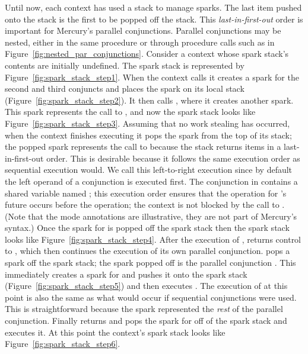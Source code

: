 Until now, each context has used a stack to manage sparks.
The last item pushed onto the stack is the first to be popped off the
stack.
This \emph{last-in-first-out} order is important for Mercury's parallel
conjunctions.
Parallel conjunctions may be nested, either in the same procedure or through
procedure calls such as in
Figure~\ref{fig:nested_par_conjunctions}.
Consider a context whose spark stack's contents are initially undefined.
The spark stack is represented by
Figure~\ref{fig:spark_stack_step1}.
When the context calls  it creates a spark
for the second and third conjuncts 
and places the spark on its local stack
(Figure~\ref{fig:spark_stack_step2}).
It then calls , where it creates another spark.
This spark represents the call to ,
and now the spark stack looks like
Figure~\ref{fig:spark_stack_step3}.
Assuming that no work stealing has occurred,
when the context finishes executing  it pops the spark from the top
of its stack;
the popped spark represents the call to  because
the stack returns items in a last-in-first-out order.
This is desirable because it follows the same execution order as sequential
execution would.
We call this left-to-right execution since by default the left operand of a
conjunction is executed first.
The conjunction in  contains a shared variable named ;
this execution order ensures that the \signal operation for 's future
occurs before the \wait operation;
the context is not blocked by the call to \wait.
(Note that the mode annotations are illustrative,
they are not part of Mercury's syntax.)
Once the spark for  is popped off the spark stack then the spark
stack looks like Figure~\ref{fig:spark_stack_step4}.
After the execution of ,  returns control to ,
which then continues the execution of its own parallel conjunction.
 pops a spark off the spark stack;
the spark popped off is the parallel conjunction
.
This immediately creates a spark for  and pushes it onto the spark
stack (Figure~\ref{fig:spark_stack_step5}) and
then executes .
The execution of  at this point is also the same as what would occur
if sequential conjunctions were used.
This is straightforward because
the spark represented the \emph{rest} of the parallel
conjunction.
Finally  returns and  pops the spark for  off of the
spark stack and executes it.
At this point the context's spark stack looks like
Figure~\ref{fig:spark_stack_step6}.

